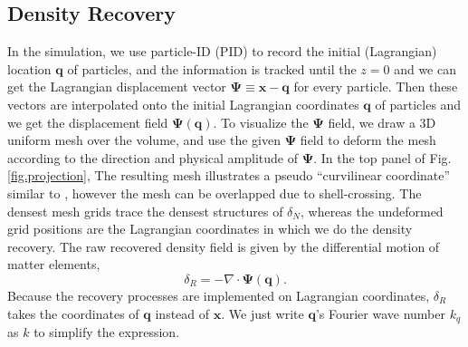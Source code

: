 \documentclass[aps,prd,twocolumn,superscriptaddress,amsfont,amssymb,amsmath,nofootinbib,showpacs,balancelastpage]{revtex4-1}
\newcommand{\bs}{\boldsymbol}
\begin{document}
\subsection{Density Recovery}\label{ss.reco}
In the simulation, we use particle-ID (PID) to record the initial (Lagrangian) location ${\bs 
q}$ of particles, and the information is tracked until the $z=0$ and we can get the 
Lagrangian displacement vector ${\bs \Psi}\equiv{\bs x}-{\bs q}$ for every 
particle. Then these vectors are interpolated onto the initial Lagrangian 
coordinates ${\bs q}$ of particles and we get the displacement field ${\bs \Psi}
({\bs q})$.
To visualize the $\bs\Psi$ field, we draw a 3D uniform mesh over the volume,
and use the given $\bs\Psi$ field to deform the mesh according to the direction
and physical amplitude of $\bs\Psi$. In the top panel of Fig.\ref{fig.projection},
The resulting mesh illustrates a pseudo
``curvilinear coordinate'' similar to \cite{1995ApJS..100..269P},
however the mesh can be overlapped due to shell-crossing. The densest mesh grids
trace the densest structures of $\delta_N$, whereas the undeformed grid positions
are the Lagrangian coordinates in which we do the density recovery.
The raw recovered density field is given by the differential motion of matter 
elements,
\begin{equation}
    \delta_R=-\nabla\cdot{\bs \Psi}({\bs q}).
\end{equation}
Because the recovery processes are implemented on Lagrangian coordinates,
$\delta_R$ takes the coordinates of $\bs q$ instead of $\bs x$.
We just write $\bs q$'s Fourier wave number
$k_q$ as $k$ to simplify the expression.
\end{document}
